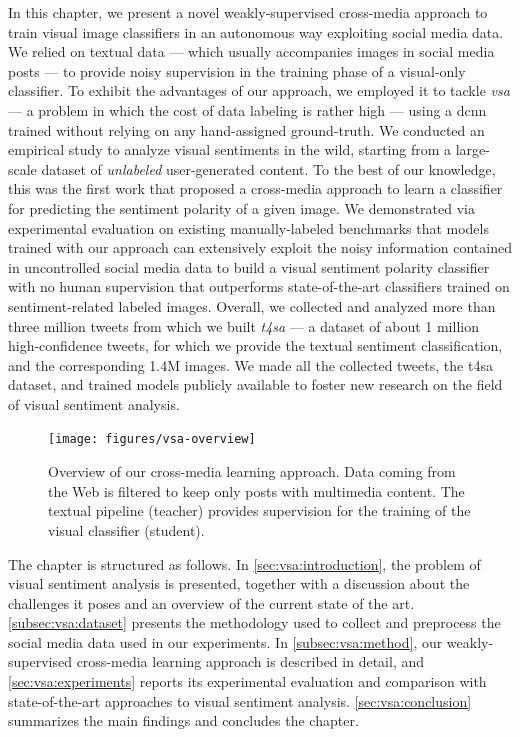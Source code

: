 In this chapter, we present a novel weakly-supervised cross-media approach to train visual image classifiers in an autonomous way exploiting social media data.
We relied on textual data --- which usually accompanies images in social media posts --- to provide noisy supervision in the training phase of a visual-only classifier.
To exhibit the advantages of our approach, we employed it to tackle \emph{\gls{vsa}} --- a problem in which the cost of data labeling is rather high --- using a \acrfull{dcnn} trained without relying on any hand-assigned ground-truth.
We conducted an empirical study to analyze visual sentiments in the wild, starting from a large-scale dataset of \emph{unlabeled} user-generated content.
To the best of our knowledge, this was the first work that proposed a cross-media approach to learn a classifier for predicting the sentiment polarity of a given image.
We demonstrated via experimental evaluation on existing manually-labeled benchmarks that models trained with our approach can extensively exploit the noisy information contained in uncontrolled social media data to build a visual sentiment polarity classifier with no human supervision that outperforms state-of-the-art classifiers trained on sentiment-related labeled images.
Overall, we collected and analyzed more than three million tweets from which we built \emph{\acrfull{t4sa}} --- a dataset of about 1 million high-confidence tweets, for which we provide the textual sentiment classification, and the corresponding 1.4M images.
We made all the collected tweets, the \gls{t4sa} dataset, and trained models publicly available to foster new research on the field of visual sentiment analysis.

\begin{figure}
    \centering
    \texttt{[image: figures/vsa-overview]}
    \caption{Overview of our cross-media learning approach.
    Data coming from the Web is filtered to keep only posts with multimedia content.
    The textual pipeline (teacher) provides supervision for the training of the visual classifier (student).}
    \label{fig:vsa:overview}
\end{figure}

The chapter is structured as follows.
In \ref{sec:vsa:introduction}, the problem of visual sentiment analysis is presented, together with a discussion about the challenges it poses and an overview of the current state of the art.
\ref{subsec:vsa:dataset} presents the methodology used to collect and preprocess the social media data used in our experiments.
In \ref{subsec:vsa:method}, our weakly-supervised cross-media learning approach is described in detail, and \ref{sec:vsa:experiments} reports its experimental evaluation and comparison with state-of-the-art approaches to visual sentiment analysis.
\ref{sec:vsa:conclusion} summarizes the main findings and concludes the chapter.

